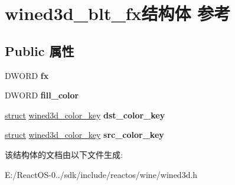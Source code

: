 \hypertarget{structwined3d__blt__fx}{}\section{wined3d\+\_\+blt\+\_\+fx结构体 参考}
\label{structwined3d__blt__fx}
\subsection*{Public 属性}
\begin{DoxyCompactItemize}
\item 
\mbox{\label{structwined3d__blt__fx_acd1746ae5aa8e49a5669f961c53524b5}} 
D\+W\+O\+RD {\bfseries fx}
\item 
\mbox{\label{structwined3d__blt__fx_a5d60eae2052b4983974c70f11a695fc5}} 
D\+W\+O\+RD {\bfseries fill\+\_\+color}
\item 
\mbox{\label{structwined3d__blt__fx_a539e91d932abdde3a4f9f697a5d4d945}} 
\hyperlink{interfacestruct}{struct} \hyperlink{structwined3d__color__key}{wined3d\+\_\+color\+\_\+key} {\bfseries dst\+\_\+color\+\_\+key}
\item 
\mbox{\label{structwined3d__blt__fx_a283bcbacd3e7ede767f98e9dc387a364}} 
\hyperlink{interfacestruct}{struct} \hyperlink{structwined3d__color__key}{wined3d\+\_\+color\+\_\+key} {\bfseries src\+\_\+color\+\_\+key}
\end{DoxyCompactItemize}


该结构体的文档由以下文件生成\+:\begin{DoxyCompactItemize}
\item 
E\+:/\+React\+O\+S-\/0../sdk/include/reactos/wine/wined3d.\+h\end{DoxyCompactItemize}
